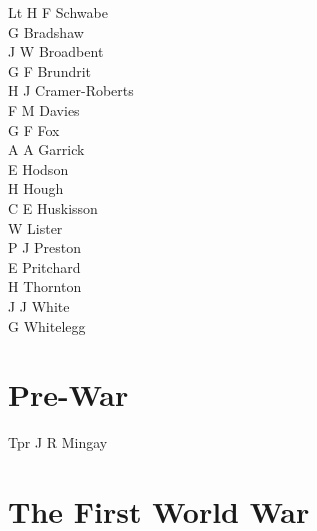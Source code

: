\begin{multicols}{2}
  \small
  \noindent
  Lt H F Schwabe \\
  G Bradshaw \\
  J W Broadbent \\
  G F Brundrit \\
  H J Cramer-Roberts \\
  F M Davies \\
  G F Fox \\
  A A Garrick \\
  E Hodson \\
  H Hough \\
  C E Huskisson \\
  W Lister \\
  P J Preston \\
  E Pritchard \\
  H Thornton \\
  J J White \\
  G Whitelegg \\
\end{multicols}

\section*{Pre-War}

\begin{multicols}{1}
  \small
  \noindent
  Tpr J R Mingay \\
\end{multicols}

\section*{The First World War}

